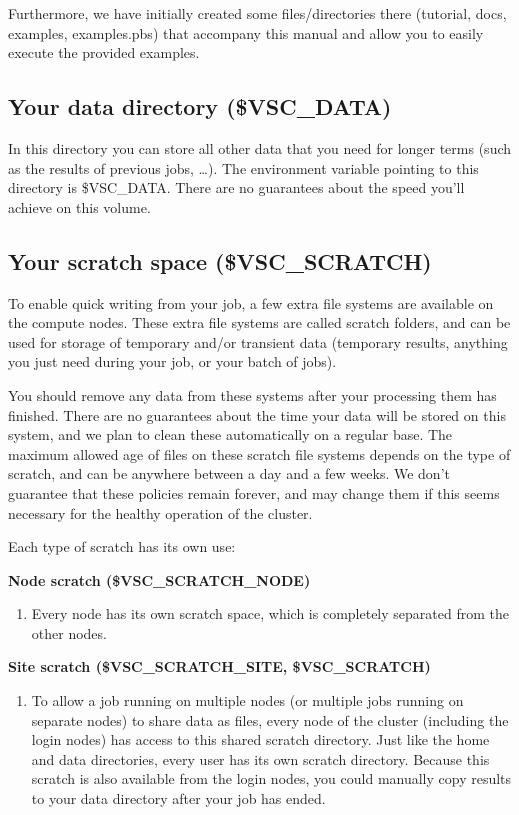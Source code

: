 Furthermore, we have initially created some files/directories there (tutorial,
docs,  examples, examples.pbs) that accompany  this manual and allow you to
easily execute the provided examples.

\subsection{Your data directory (\$VSC\_DATA)}

In this directory you can store all other data that you need for longer terms
(such as the results of previous jobs, \ldots). The environment variable
pointing to this directory is \$VSC\_DATA. There are no guarantees about the
speed you'll achieve on this volume.

\subsection{Your scratch space (\$VSC\_SCRATCH)}

To enable quick writing from your job, a few extra file systems are available
on the compute nodes. These extra file systems are called scratch folders, and can
be used for storage of temporary and/or transient data (temporary results,
anything you just need during your job, or your batch of jobs).

You should remove any data from these systems after your processing them has
finished. There are no guarantees about the time your data will be stored on
this system, and we plan to clean these automatically on a regular base. The
maximum allowed age of files on these scratch file systems depends on the type
of scratch, and can be anywhere between a day and a few weeks. We don't
guarantee that these policies remain forever, and may change them if this seems
necessary for the healthy operation of the cluster.

Each type of scratch has its own use:

\textbf{Node scratch (\$VSC\_SCRATCH\_NODE)}
\begin{enumerate}
\item Every node has its own scratch space, which is completely separated from the other nodes.
\end{enumerate}

\textbf{Site scratch (\$VSC\_SCRATCH\_SITE, \$VSC\_SCRATCH)}
\begin{enumerate}
  \item To allow a job running on multiple nodes (or multiple jobs running on
    separate nodes) to share data as files, every node of the cluster
    (including the login nodes) has access to this shared scratch directory.
    Just like the home and data directories, every user has its own scratch
    directory. Because this scratch is also available from the login nodes, you
    could manually copy results to your data directory after your job has
    ended.
\end{enumerate}

